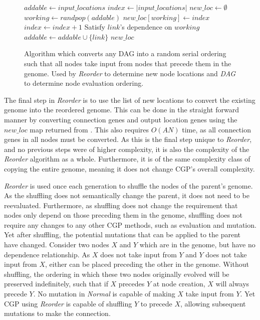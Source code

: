 \documentclass[journal]{IEEEtran}
\begin{document}
\begin{figure}
  \begin{algorithmic}
    \State $addable \leftarrow input\_locations$
    \State $index \leftarrow |input\_locations|$
    \State $new\_loc \leftarrow \emptyset$
      \State $working \leftarrow randpop(addable)$
        \State $new\_loc[working] \leftarrow index$
        \State $index \leftarrow index + 1$
      \EndIf
        \State Satisfy $link$'s dependence on $working$
          \State $addable \leftarrow addable \cup \{link\}$
        \EndIf
      \EndFor
    \EndWhile
    \State\Return $new\_loc$
    \EndProcedure
  \end{algorithmic}
  \caption{Algorithm which converts any DAG into a random serial ordering such
           that all nodes take input from nodes that precede them in the genome.
           Used by \emph{Reorder} to determine new node locations and \emph{DAG} to
           determine node evaluation ordering.}
  \label{fig:reorder}
\end{figure}

The final step in \emph{Reorder} is to use the list of new locations to convert
the existing genome into the reordered genome.  This can be done in the straight
forward manner by converting connection genes and output location genes using
the $new\_loc$ map returned from .
This also requires $O(AN)$ time, as all connection genes in all nodes must
be converted.  As this is the final step unique to \emph{Reorder}, and
no previous steps were of higher complexity, it is also the complexity of
the \emph{Reorder} algorithm as a whole.  Furthermore, it is of the same complexity class
of copying the entire genome, meaning it does not change CGP's overall complexity.

\emph{Reorder} is used once each generation to shuffle the nodes of the parent's
genome.  As the shuffling does not semantically change the parent, it does
not need to be reevaluated.  Furthermore, as shuffling does not change the requirement
that nodes only depend on those preceding them in the genome, shuffling does not
require any changes to any other CGP methods, such as evaluation and mutation.
Yet after shuffling, the potential mutations that can be applied to the parent
have changed.  Consider two nodes $X$ and $Y$ which are in the genome, but
have no dependence relationship.  As $X$ does not take input from $Y$ and
$Y$ does not take input from $X$, either can be placed preceding the other
in the genome.  Without shuffling, the ordering in which these two nodes originally
evolved will be preserved indefinitely, such that if $X$ precedes $Y$ at node creation,
$X$ will always precede $Y$.  No mutation in \emph{Normal} is capable of making $X$
take input from $Y$.  Yet CGP using \emph{Reorder} is capable of shuffling $Y$ to
precede $X$, allowing subsequent mutations to make the connection.
\end{document}
